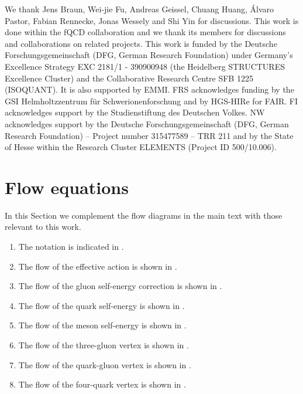 \documentclass[aps,twocolumn,prd,superscriptaddress]{revtex4-2}
\begin{document}
\begin{acknowledgments}
	We thank Jens Braun, Wei-jie Fu, Andreas Geissel, Chuang Huang, Álvaro Pastor, Fabian Rennecke, Jonas Wessely and Shi Yin for discussions. This work is done within the fQCD collaboration \cite{fQCD} and we thank its members for discussions and collaborations on related projects. This work is funded by the Deutsche Forschungsgemeinschaft (DFG, German Research Foundation) under Germany’s Excellence Strategy EXC 2181/1 - 390900948 (the Heidelberg STRUCTURES Excellence Cluster) and the Collaborative Research Centre SFB 1225 (ISOQUANT). It is also supported by EMMI. 
	FRS acknowledges funding by the GSI Helmholtzzentrum f\"ur Schwerionenforschung and by HGS-HIRe for FAIR. FI acknowledges support by the Studienstiftung des Deutschen Volkes. 
	NW acknowledges support by the Deutsche Forschungsgemeinschaft (DFG, German Research Foundation) – Project number 315477589 – TRR 211 and by the State of Hesse within the Research Cluster ELEMENTS (Project ID 500/10.006). 
\end{acknowledgments}
%


\appendix
\begingroup
\allowdisplaybreaks


\section{Flow equations}
\label{app:flows}	

In this Section we complement the flow diagrams in the main text with those relevant to this work. 
%
\begin{enumerate}
	\item The notation is indicated in .
	\item The flow of the effective action is shown in .
	\item The flow of the gluon self-energy correction is shown in .
	\item The flow of the quark self-energy is shown in .
	\item The flow of the meson self-energy is shown in .
	\item The flow of the three-gluon vertex is shown in .
	\item The flow of the quark-gluon vertex is shown in .
	\item The flow of the four-quark vertex is shown in .
\end{enumerate}
%
\end{document}
